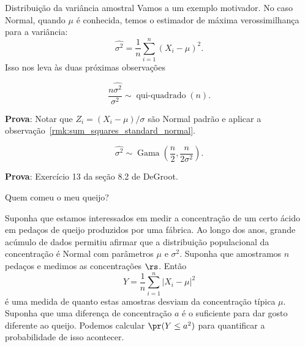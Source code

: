 \begin{frame}{Distribuição da variância amostral}
 Vamos a um exemplo motivador.
No caso Normal, quando $\mu$ é conhecida, temos o estimador de máxima verossimilhança para a variância:
\[ \hat{\sigma^2} = \frac{1}{n} \sum_{i=1}^n (X_i - \mu)^2. \]
Isso nos leva às duas próximas observações
\begin{obs}
\label{rmk:linear_transform_MLE_normal}
 \begin{equation*}
 \label{eq:linear_transform_MLE_normal}
  \frac{n\hat{\sigma^2}}{\sigma^2} \sim \operatorname{qui-quadrado}(n).
 \end{equation*}
\end{obs}
\textbf{Prova}: Notar que $Z_i = (X_i-\mu)/\sigma$ são Normal padrão e aplicar a observação~\ref{rmk:sum_squares_standard_normal}.

\begin{obs}
\label{rmk:sampling_distribution_normal_variance}
 \begin{equation*}
  \hat{\sigma^2} \sim \operatorname{Gama}\left(\frac{n}{2}, \frac{n}{2\sigma^2} \right).
 \end{equation*}

\end{obs}
\textbf{Prova}: Exercício 13 da seção 8.2 de DeGroot. 
\end{frame}

\begin{frame}{Quem comeu o meu queijo?}
 \begin{exemplo}
 \label{ex:acid_concentration_cheese}
  Suponha que estamos interessados em medir a concentração de um certo ácido em pedaços de queijo produzidos por uma fábrica.
  Ao longo dos anos, grande acúmulo de dados permitiu afirmar que a distribuição populacional da concentração é Normal com parâmetros $\mu$ e $\sigma^2$.
  Suponha que amostramos $n$ pedaços e medimos as concentrações $\rs$.
  Então 
  \[ Y = \frac{1}{n}\sum_{i=1}^n |X_i-\mu|^2 \]
é uma medida de quanto estas amostras desviam da concentração típica $\mu$.
Suponha que uma diferença de concentração $a$ é o suficiente para dar gosto diferente ao queijo.
Podemos calcular $\pr(Y \leq a^2)$ para quantificar a probabilidade de isso acontecer.
 \end{exemplo}
\end{frame}

